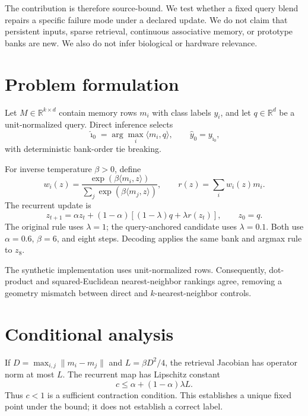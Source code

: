 \documentclass[11pt]{article}
\begin{document}
The contribution is therefore source-bound. We test whether a fixed query blend repairs a specific failure mode under a declared update. We do not claim that persistent inputs, sparse retrieval, continuous associative memory, or prototype banks are new. We also do not infer biological or hardware relevance.

\section{Problem formulation}
Let $M\in\mathbb{R}^{k\times d}$ contain memory rows $m_i$ with class labels $y_i$, and let $q\in\mathbb{R}^d$ be a unit-normalized query. Direct inference selects
\begin{equation}
  \hat\imath_0=\arg\max_i\langle m_i,q\rangle,
  \qquad \hat y_0=y_{\hat\imath_0},
\end{equation}
with deterministic bank-order tie breaking.

For inverse temperature $\beta>0$, define
\begin{equation}
  w_i(z)=\frac{\exp(\beta\langle m_i,z\rangle)}{\sum_j\exp(\beta\langle m_j,z\rangle)},
  \qquad r(z)=\sum_i w_i(z)m_i.
\end{equation}
The recurrent update is
\begin{equation}
  z_{t+1}=\alpha z_t+(1-\alpha)\left[(1-\lambda)q+\lambda r(z_t)\right],
  \qquad z_0=q. \label{eq:update}
\end{equation}
The original rule uses $\lambda=1$; the query-anchored candidate uses $\lambda=0.1$. Both use $\alpha=0.6$, $\beta=6$, and eight steps. Decoding applies the same bank and argmax rule to $z_8$.

The synthetic implementation uses unit-normalized rows. Consequently, dot-product and squared-Euclidean nearest-neighbor rankings agree, removing a geometry mismatch between direct and $k$-nearest-neighbor controls.

\section{Conditional analysis}
If $D=\max_{i,j}\|m_i-m_j\|$ and $L=\beta D^2/4$, the retrieval Jacobian has operator norm at most $L$. The recurrent map has Lipschitz constant
\begin{equation}
  c\leq\alpha+(1-\alpha)\lambda L.
\end{equation}
Thus $c<1$ is a sufficient contraction condition. This establishes a unique fixed point under the bound; it does not establish a correct label.
\end{document}
